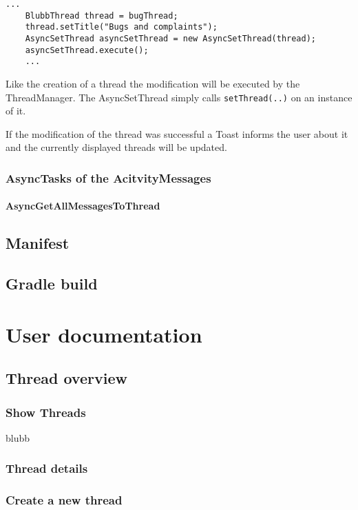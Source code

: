 \documentclass[12pt,a4paper,oneside]{report}
\newcommand{\code}[1]{\lstinline{#1}}
\begin{document}
\begin{lstlisting}[caption=AsyncSetThread example, label=lst:AsyncSetThread]
	...
	BlubbThread thread = bugThread;
	thread.setTitle("Bugs and complaints");
	AsyncSetThread asyncSetThread = new AsyncSetThread(thread);
	asyncSetThread.execute();
	...
\end{lstlisting}
Like the creation of a thread the modification will be executed by the ThreadManager. The AsyncSetThread simply calls \code{setThread(..)} on an instance of it.

If the modification of the thread was successful a Toast informs the user about it and the currently displayed threads will be updated.

\subsection{AsyncTasks of the AcitvityMessages}

\subsubsection{AsyncGetAllMessagesToThread}
\label{subsubsec:AsyncGetAllMessagesToThread}

\section{Manifest}

\section{Gradle build}

\chapter{User documentation}

\section{Thread overview}

\subsection{Show Threads}
blubb
\subsection{Thread details}

\subsection{Create a new thread}
\end{document}
